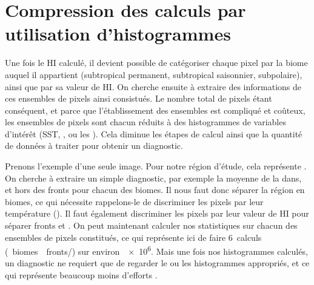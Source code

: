 \begin{figure}
  \centering
  \label{fig:exemples-fronts}
\end{figure}


\section{Compression des calculs par utilisation d'histogrammes}
\label{sec:extraction-hist}

Une fois le HI calculé, il devient possible de catégoriser chaque pixel par la biome auquel il appartient (subtropical permanent, subtropical saisonnier, subpolaire), ainsi que par sa valeur de HI.
On cherche ensuite à extraire des informations de ces ensembles de pixels ainsi consistués.
Le nombre total de pixels étant conséquent, et parce que l'établissement des ensembles est compliqué et coûteux, les ensembles de pixels sont chacun réduits à des histogrammes de variables d'intérêt (SST, , ou les ).
Cela diminue les étapes de calcul ainsi que la quantité de données à traiter pour obtenir un diagnostic.

Prenons l'exemple d'une seule image. Pour notre région d'étude, cela représente .
On cherche à extraire un simple diagnostic, par exemple la moyenne de la  dans, et hors des fronts pour chacun des biomes.
Il nous faut donc séparer la région en biomes, ce qui nécessite rappelons-le de discriminer les pixels par leur température ().
Il faut également discriminer les pixels par leur valeur de HI pour séparer fronts et .
On peut maintenant calculer nos statistiques sur chacun des ensembles de pixels constitués, ce qui représente ici de faire 6~calculs (~biomes~\texttimes\ fronts/) sur environ~\qty{e6}{\pixels}.
Mais une fois nos histogrammes calculés, un diagnostic ne requiert que de regarder le ou les histogrammes appropriés, et ce qui représente beaucoup moins d'efforts .

